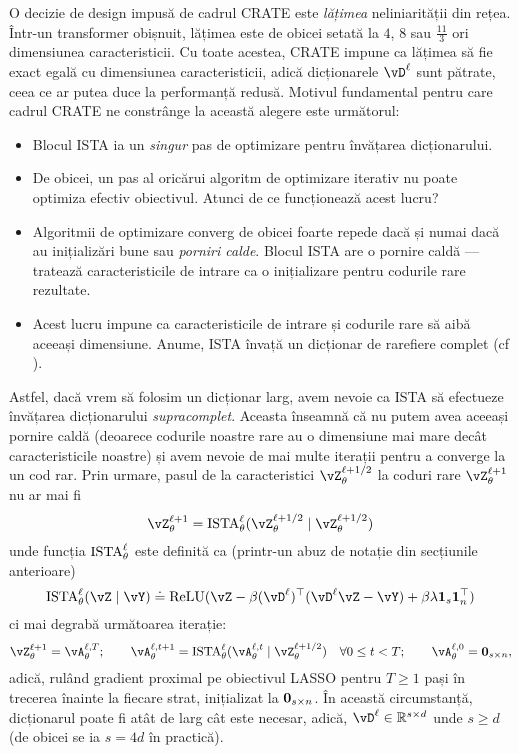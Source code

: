 \documentclass[../../book-main_ro.tex]{subfiles}
\begin{document}
O decizie de design impusă de cadrul CRATE este \textit{lățimea} neliniarității din rețea. Într-un transformer obișnuit, lățimea este de obicei setată la \(4\), \(8\) sau \(\frac{11}{3}\) ori dimensiunea caracteristicii. Cu toate acestea, CRATE impune ca lățimea să fie exact egală cu dimensiunea caracteristicii, adică dicționarele \(\vD^{\ell}\) sunt pătrate, ceea ce ar putea duce la performanță redusă. Motivul fundamental pentru care cadrul CRATE ne constrânge la această alegere este următorul:
\begin{itemize}
    \item Blocul ISTA ia un \textit{singur} pas de optimizare pentru învățarea dicționarului.
    \item De obicei, un pas al oricărui algoritm de optimizare iterativ nu poate optimiza efectiv obiectivul. Atunci de ce funcționează acest lucru?
    \item Algoritmii de optimizare converg de obicei foarte repede dacă și numai dacă au inițializări bune sau \textit{porniri calde}. Blocul ISTA are o pornire caldă --- tratează caracteristicile de intrare ca o inițializare pentru codurile rare rezultate.
    \item Acest lucru impune ca caracteristicile de intrare și codurile rare să aibă aceeași dimensiune. Anume, ISTA învață un dicționar de rarefiere complet (cf ).
\end{itemize}
Astfel, dacă vrem să folosim un dicționar larg, avem nevoie ca ISTA să efectueze învățarea dicționarului \textit{supracomplet}. Aceasta înseamnă că nu putem avea aceeași pornire caldă (deoarece codurile noastre rare au o dimensiune mai mare decât caracteristicile noastre) și avem nevoie de mai multe iterații pentru a converge la un cod rar. Prin urmare, pasul de la caracteristici \(\vZ_{\theta}^{\ell + 1/2}\) la coduri rare \(\vZ_{\theta}^{\ell + 1}\) nu ar mai fi
\begin{equation}
    \vZ_{\theta}^{\ell + 1} = \ISTA_{\theta}^{\ell}(\vZ_{\theta}^{\ell + 1/2} \mid \vZ_{\theta}^{\ell + 1/2})
\end{equation}
unde funcția \(\operatorname{ISTA}_{\theta}^{\ell}\) este definită ca (printr-un abuz de notație din secțiunile anterioare)
\begin{equation}
    \ISTA_{\theta}^{\ell}(\vZ \mid \vY) \doteq \ReLU(\vZ - \beta (\vD^{\ell})^{\top}(\vD^{\ell}\vZ - \vY) + \beta \lambda \vone_{s}\vone_{n}^{\top})
\end{equation}
ci mai degrabă următoarea iterație:
\begin{equation}
    \vZ_{\theta}^{\ell + 1} = \vA_{\theta}^{\ell, T}; \qquad \vA_{\theta}^{\ell, t + 1} = \ISTA_{\theta}^{\ell}(\vA_{\theta}^{\ell, t} \mid \vZ_{\theta}^{\ell + 1/2}) \quad \forall 0 \leq t < T; \qquad \vA_{\theta}^{\ell, 0} = \vzero_{s \times n},
\end{equation}
adică, rulând gradient proximal pe obiectivul LASSO pentru \(T \geq 1\) pași în trecerea înainte la fiecare strat, inițializat la \(\bm{0}_{s \times n}\). În această circumstanță, dicționarul poate fi atât de larg cât este necesar, adică, \(\vD^{\ell} \in \R^{s \times d}\) unde \(s \geq d\) (de obicei se ia \(s = 4d\) în practică).
\end{document}
